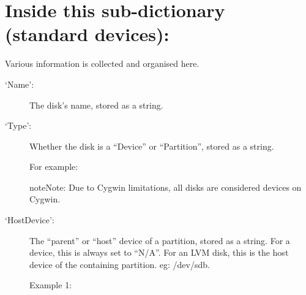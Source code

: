 \documentclass[letterpaper,10pt,english]{sphinxmanual}
\begin{document}
\section{Inside this sub-dictionary (standard devices):}
\label{\detokenize{format:inside-this-sub-dictionary-standard-devices}}
Various information is collected and organised here.
\begin{description}
\item[{‘Name’:}] \leavevmode
The disk’s name, stored as a string.

\item[{‘Type’:}] \leavevmode
Whether the disk is a “Device” or “Partition”, stored as a string.
\begin{description}
\item[{For example:}] \leavevmode
\begin{sphinxVerbatim}[commandchars=\\\{\}]
\PYG{p}{[}\PYG{p}{]}\PYG{p}{[}\PYG{p}{]}
\end{sphinxVerbatim}

\end{description}

\begin{sphinxadmonition}{note}{Note:}
Due to Cygwin limitations, all disks are considered devices on Cygwin.
\end{sphinxadmonition}

\item[{‘HostDevice’:}] \leavevmode
The “parent” or “host” device of a partition, stored as a string.
For a device, this is always set to “N/A”. For an LVM disk, this is
the host device of the containing partition. eg: /dev/sdb.
\begin{description}
\item[{Example 1:}] \leavevmode
\begin{sphinxVerbatim}[commandchars=\\\{\}]
\PYG{p}{[}\PYG{p}{]}\PYG{p}{[}\PYG{p}{]}
\end{sphinxVerbatim}


\end{description}
\end{description}
\end{document}
